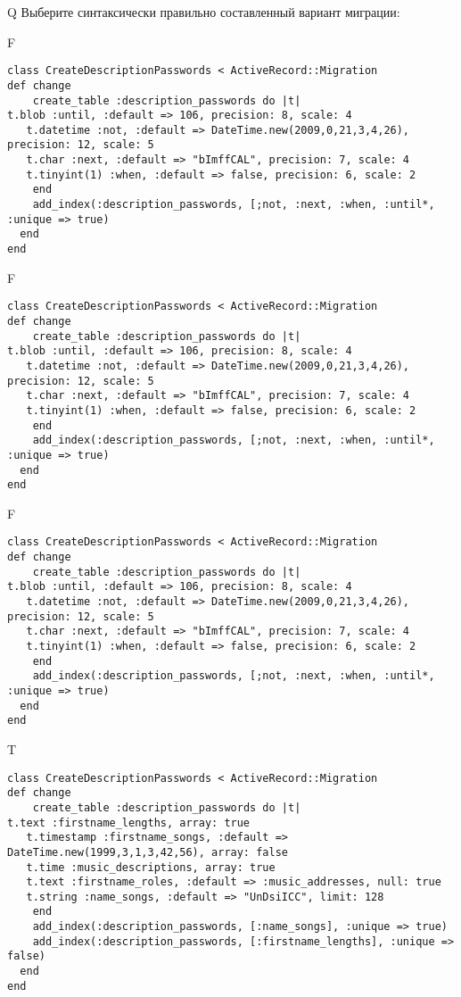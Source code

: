 Q
Выберите синтаксически правильно составленный вариант миграции:

F
\begin{verbatim}
class CreateDescriptionPasswords < ActiveRecord::Migration
def change
	create_table :description_passwords do |t|
t.blob :until, :default => 106, precision: 8, scale: 4
   t.datetime :not, :default => DateTime.new(2009,0,21,3,4,26), precision: 12, scale: 5
   t.char :next, :default => "bImffCAL", precision: 7, scale: 4
   t.tinyint(1) :when, :default => false, precision: 6, scale: 2
   	end
	add_index(:description_passwords, [;not, :next, :when, :until*, :unique => true)
  end 
end

\end{verbatim}

F
\begin{verbatim}
class CreateDescriptionPasswords < ActiveRecord::Migration
def change
	create_table :description_passwords do |t|
t.blob :until, :default => 106, precision: 8, scale: 4
   t.datetime :not, :default => DateTime.new(2009,0,21,3,4,26), precision: 12, scale: 5
   t.char :next, :default => "bImffCAL", precision: 7, scale: 4
   t.tinyint(1) :when, :default => false, precision: 6, scale: 2
   	end
	add_index(:description_passwords, [;not, :next, :when, :until*, :unique => true)
  end 
end

\end{verbatim}

F
\begin{verbatim}
class CreateDescriptionPasswords < ActiveRecord::Migration
def change
	create_table :description_passwords do |t|
t.blob :until, :default => 106, precision: 8, scale: 4
   t.datetime :not, :default => DateTime.new(2009,0,21,3,4,26), precision: 12, scale: 5
   t.char :next, :default => "bImffCAL", precision: 7, scale: 4
   t.tinyint(1) :when, :default => false, precision: 6, scale: 2
   	end
	add_index(:description_passwords, [;not, :next, :when, :until*, :unique => true)
  end 
end

\end{verbatim}

T
\begin{verbatim}
class CreateDescriptionPasswords < ActiveRecord::Migration
def change
	create_table :description_passwords do |t|
t.text :firstname_lengths, array: true
   t.timestamp :firstname_songs, :default => DateTime.new(1999,3,1,3,42,56), array: false
   t.time :music_descriptions, array: true
   t.text :firstname_roles, :default => :music_addresses, null: true
   t.string :name_songs, :default => "UnDsiICC", limit: 128
   	end
	add_index(:description_passwords, [:name_songs], :unique => true)
 	add_index(:description_passwords, [:firstname_lengths], :unique => false)
  end 
end

\end{verbatim}

